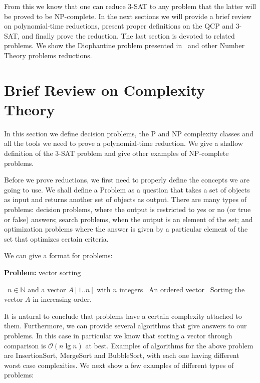 \documentclass{amsart}
\theoremstyle{plain}
\newcommand{\bigo}{\mathcal{O}}
\begin{document}
From this we know that one can reduce 3-SAT to any problem that the latter will be proved to be
NP-complete. In the next sections we will provide a brief review on polynomial-time reductions,
present proper definitions on the QCP and 3-SAT, and finally prove the reduction. The last section
is devoted to related problems. We show the Diophantine problem presented in~\cite{qcp2} and other
Number Theory problems reductions.

\section{Brief Review on Complexity Theory}

In this section we define decision problems, the P and NP complexity classes and all the tools we
need to prove a polynomial-time reduction. We give a shallow definition of the 3-SAT problem and
give other examples of NP-complete problems.

Before we prove reductions, we first need to properly define the concepts we are going to use. We
shall define a Problem as a question that takes a set of objects as input and returns another set
of objects as output. There are many types of problems: decision problems, where the output is
restricted to yes or no (or true or false) answers; search problems, when the output is an element
of the set; and optimization problems where the answer is given by a particular element of the set
that optimizes certain criteria.

We can give a format for problems:

\begin{algorithm}[h]
  \caption*{\textbf{Problem:} vector sorting}
  \begin{algorithmic}[1]
    \Require\, $n\in\mathbb{N}$ and a vector $A[1..n]$ with $n$ integers
    \Ensure\, An ordered vector
    \Description\, Sorting the vector $A$ in increasing order.
  \end{algorithmic}
\end{algorithm}

It is natural to conclude that problems have a certain complexity attached to them. Furthermore, we
can provide several algorithms that give answers to our problems. In this case in particular we
know that sorting a vector through comparison is $\bigo(n\lg n)$ at best. Examples of algorithms
for the above problem are InsertionSort, MergeSort and BubbleSort, with each one having different
worst case complexities.  We next show a few examples of different types of problems:
\newpage
\end{document}
